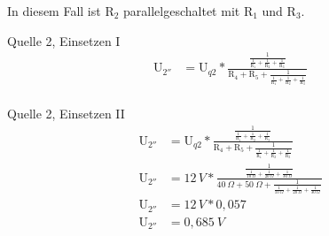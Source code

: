 In diesem Fall ist $\text{R}_2$ parallelgeschaltet mit $\text{R}_1$ und $\text{R}_3$.
\begin{frame}{Quelle 2, Einsetzen I}
  \begin{align}
    \text{U}_{2''} &= \text{U}_{q2}*\frac{\frac{1}{\frac{1}{\text{R}_1}+\frac{1}{\text{R}_2}+\frac{1}{\text{R}_3}}}{\text{R}_4 + \text{R}_5 + \frac{1}{\frac{1}{\text{R}_1}+\frac{1}{\text{R}_2}+\frac{1}{\text{R}_3}}}\\
  \end{align}
\end{frame}

\begin{frame}{Quelle 2, Einsetzen II}
  \begin{align}
    \text{U}_{2''} &= \text{U}_{q2}*\frac{\frac{1}{\frac{1}{\text{R}_1}+\frac{1}{\text{R}_2}+\frac{1}{\text{R}_3}}}{\text{R}_4 + \text{R}_5 + \frac{1}{\frac{1}{\text{R}_1}+\frac{1}{\text{R}_2}+\frac{1}{\text{R}_3}}}\\
    \text{U}_{2''} &= 12\,V*\frac{\frac{1}{\frac{1}{10\ \Omega}+\frac{1}{20\ \Omega}+\frac{1}{30\ \Omega}}}{40\ \Omega + 50\ \Omega + \frac{1}{\frac{1}{10\ \Omega}+\frac{1}{20\ \Omega}+\frac{1}{30\ \Omega}}}\\
    \text{U}_{2''} &= 12\,V*0,057 \\
    \text{U}_{2''} &= 0,685\ V
  \end{align}
\end{frame}


